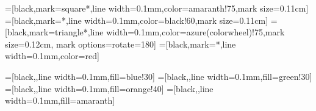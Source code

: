 
=[black,mark=square*,line width=0.1mm,color=amaranth!75,mark size=0.11cm]
=[black,mark=*,line width=0.1mm,color=black!60,mark size=0.11cm]
=[black,mark=triangle*,line width=0.1mm,color=azure(colorwheel)!75,mark size=0.12cm, mark options={rotate=180}]
=[black,mark=*,line width=0.1mm,color=red]


=[black,,line width=0.1mm,fill=blue!30]
=[black,,line width=0.1mm,fill=green!30]
=[black,,line width=0.1mm,fill=orange!40]
=[black,,line width=0.1mm,fill=amaranth]
